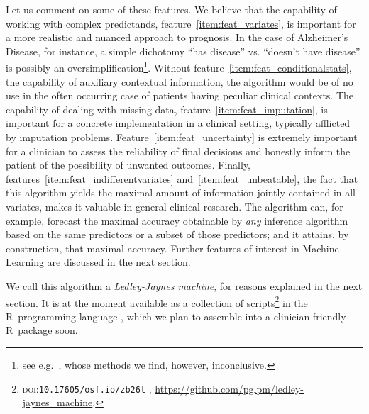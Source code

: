 \documentclass[utf8]{FrontiersinHarvard_mod} %
\providecommand{\href}[2]{#2}
\newcommand*{\doi}[1]{%
\href{https://doi.org/#1}{\textsc{doi}:\allowbreak\nolinkurl{#1}}%
}
\newcommand*{\eg}{{e.g.}}
\renewcommand*{\|}[1][]{\nonscript\:#1\vert\nonscript\:\mathopen{}}
\newcommand*{\ad}{Alzheimer's Disease}
\newcommand*{\ljm}{Ledley-Jaynes machine}
\begin{document}
Let us comment on some of these features. We believe that the capability of working with complex predictands, feature~\ref{item:feat_variates}, is important for a more realistic and nuanced approach to prognosis. In the case of \ad, for instance, a simple dichotomy \enquote{has disease} vs. \enquote{doesn't have disease} is possibly an oversimplification\footnote{see \eg\ \citet{edmondsetal2015,edmondsetal2020},  whose methods we find, however, inconclusive.}.
Without feature~\ref{item:feat_conditionalstats}, the capability of auxiliary contextual information, the algorithm would be of no use in the often occurring case of patients having peculiar clinical contexts. The capability of dealing with missing data, feature~\ref{item:feat_imputation}, is important for a concrete implementation in a clinical setting, typically afflicted by imputation problems. Feature~\ref{item:feat_uncertainty} is extremely important for a clinician to assess the reliability of final decisions and honestly inform the patient of the possibility of unwanted outcomes. Finally, features~\ref{item:feat_indifferentvariates} and~\ref{item:feat_unbeatable}, the fact that this algorithm yields the maximal amount of information jointly contained in all variates, makes it valuable in general clinical research. The algorithm can, for example, forecast the maximal accuracy obtainable by \emph{any} inference algorithm based on the same predictors or a subset of those predictors; and it attains, by construction, that maximal accuracy. Further features of interest in Machine Learning are discussed in the next section.

We call this algorithm a \emph{\ljm}, for reasons explained in the next section. It is at the moment available as a collection of scripts\footnote{\doi{10.17605/osf.io/zb26t}, \url{https://github.com/pglpm/ledley-jaynes\_machine}.} in the R~programming language \citep{rcoreteam1995_r2023}, which we plan to assemble into a clinician-friendly R~package soon.
\end{document}
